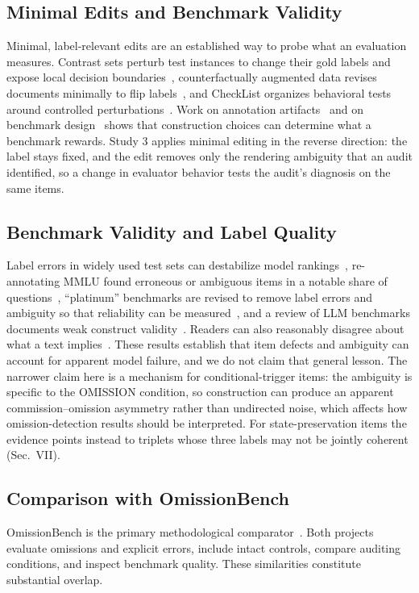 \documentclass{ieeeaccess}
\begin{document}
\subsection{Minimal Edits and Benchmark Validity}
Minimal, label-relevant edits are an established way to probe what an evaluation measures. Contrast sets perturb test instances to change their gold labels and expose local decision boundaries~\cite{gardner2020contrast}, counterfactually augmented data revises documents minimally to flip labels~\cite{kaushik2020counterfactual}, and CheckList organizes behavioral tests around controlled perturbations~\cite{ribeiro2020checklist}. Work on annotation artifacts~\cite{gururangan2018artifacts} and on benchmark design~\cite{bowman2021fix,raji2021everything} shows that construction choices can determine what a benchmark rewards. Study 3 applies minimal editing in the reverse direction: the label stays fixed, and the edit removes only the rendering ambiguity that an audit identified, so a change in evaluator behavior tests the audit's diagnosis on the same items.

\subsection{Benchmark Validity and Label Quality}
\label{sec:validity}
Label errors in widely used test sets can destabilize model rankings~\cite{northcutt2021label}, re-annotating MMLU found erroneous or ambiguous items in a notable share of questions~\cite{gema2025mmlu}, ``platinum'' benchmarks are revised to remove label errors and ambiguity so that reliability can be measured~\cite{vendrow2025platinum}, and a review of LLM benchmarks documents weak construct validity~\cite{bean2025construct}. Readers can also reasonably disagree about what a text implies~\cite{pavlick2019disagree}. These results establish that item defects and ambiguity can account for apparent model failure, and we do not claim that general lesson. The narrower claim here is a mechanism for conditional-trigger items: the ambiguity is specific to the OMISSION condition, so construction can produce an apparent commission--omission asymmetry rather than undirected noise, which affects how omission-detection results should be interpreted. For state-preservation items the evidence points instead to triplets whose three labels may not be jointly coherent (Sec.~VII).

\subsection{Comparison with OmissionBench}
OmissionBench is the primary methodological comparator~\cite{fox2026omission,omissionbench2026}. Both projects evaluate omissions and explicit errors, include intact controls, compare auditing conditions, and inspect benchmark quality. These similarities constitute substantial overlap.
\end{document}
